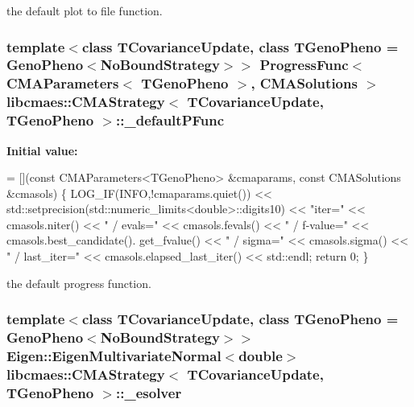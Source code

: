 the default plot to file function. \hypertarget{classlibcmaes_1_1CMAStrategy_af6d980c670eef47ee810645739999d5b}{
\subsubsection[{\-\_\-default\-P\-Func}]{\setlength{\rightskip}{0pt plus 5cm}template$<$class T\-Covariance\-Update, class T\-Geno\-Pheno = Geno\-Pheno$<$\-No\-Bound\-Strategy$>$$>$ Progress\-Func$<$ {\bf C\-M\-A\-Parameters}$<$ T\-Geno\-Pheno $>$, {\bf C\-M\-A\-Solutions} $>$ {\bf libcmaes\-::\-C\-M\-A\-Strategy}$<$ T\-Covariance\-Update, T\-Geno\-Pheno $>$\-::\-\_\-default\-P\-Func\hspace{0.3cm}{\ttfamily [static]}}}\label{classlibcmaes_1_1CMAStrategy_af6d980c670eef47ee810645739999d5b}
{\bfseries Initial value\-:}
\begin{DoxyCode}
= [](\textcolor{keyword}{const} CMAParameters<TGenoPheno> &cmaparams, \textcolor{keyword}{const} CMASolutions &cmasols)
  \{
    LOG\_IF(INFO,!cmaparams.quiet()) << std::setprecision(std::numeric\_limits<double>::digits10) << \textcolor{stringliteral}{"iter="} 
      << cmasols.niter() << \textcolor{stringliteral}{" / evals="} << cmasols.fevals() << \textcolor{stringliteral}{" / f-value="} << cmasols.best\_candidate().
      get\_fvalue() <<  \textcolor{stringliteral}{" / sigma="} << cmasols.sigma() << \textcolor{stringliteral}{" / last\_iter="} << cmasols.elapsed\_last\_iter() << std::endl;
    \textcolor{keywordflow}{return} 0;
  \}
\end{DoxyCode}
the default progress function. \hypertarget{classlibcmaes_1_1CMAStrategy_ad9d6fe34da1fb94315e86625210fe009}{
\subsubsection[{\-\_\-esolver}]{\setlength{\rightskip}{0pt plus 5cm}template$<$class T\-Covariance\-Update, class T\-Geno\-Pheno = Geno\-Pheno$<$\-No\-Bound\-Strategy$>$$>$ {\bf Eigen\-::\-Eigen\-Multivariate\-Normal}$<$double$>$ {\bf libcmaes\-::\-C\-M\-A\-Strategy}$<$ T\-Covariance\-Update, T\-Geno\-Pheno $>$\-::\-\_\-esolver\hspace{0.3cm}{\ttfamily [protected]}}}\label{classlibcmaes_1_1CMAStrategy_ad9d6fe34da1fb94315e86625210fe009}
